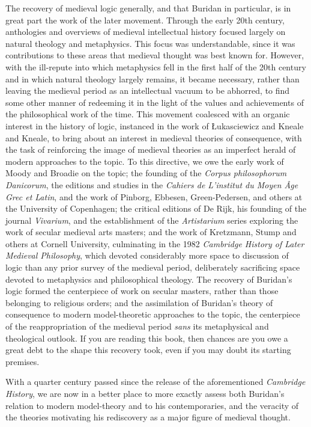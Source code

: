 The recovery of medieval logic generally, and that Buridan in particular, is in great part the work of the later movement. Through the early 20th century, anthologies and overviews of medieval intellectual history focused largely on natural theology and metaphysics. This focus was understandable, since it was contributions to these areas that medieval thought was best known for. However, with the ill-repute into which metaphysics fell in the first half of the 20th century and in which natural theology largely remains, it became necessary, rather than leaving the medieval period as an intellectual vacuum to be abhorred, to find some other manner of redeeming it in the light of the values and achievements of the philosophical work of the time. This movement coalesced with an organic interest in the history of logic, instanced in the work of \L{}ukasciewicz and Kneale and Kneale, to bring about an interest in medieval theories of consequence, with the task of reinforcing the image of medieval theories as an imperfect herald of modern approaches to the topic. To this directive, we owe the early work of Moody and Broadie on the topic; the founding of the \textit{Corpus philosophorum Danicorum}, the editions and studies in the \textit{Cahiers de L'institut du Moyen \^{A}ge Grec et Latin}, and the work of Pinborg, Ebbesen, Green-Pedersen, and others at the University of Copenhagen; the critical editions of De Rijk, his founding of the journal \textit{Vivarium}, and the establishment of the \textit{Artistarium} series exploring the work of secular medieval arts masters; and the work of Kretzmann, Stump and others at Cornell University, culminating in the 1982 \textit{Cambridge History of Later Medieval Philosophy}, which devoted considerably more space to discussion of logic than any prior survey of the medieval period, deliberately sacrificing space devoted to metaphysics and philosophical theology. The recovery of Buridan's logic formed the centerpiece of work on secular masters, rather than those belonging to religious orders; and the assimilation of Buridan's theory of consequence to modern model-theoretic approaches to the topic, the centerpiece of the reappropriation of the medieval period \textit{sans} its metaphysical and theological outlook. If you are reading this book, then chances are you owe a great debt to the shape this recovery took, even if you may doubt its starting premises.

With a quarter century passed since the release of the aforementioned \textit{Cambridge History}, we are now in a better place to more exactly assess both Buridan's relation to modern model-theory and to his contemporaries, and the veracity of the theories motivating his rediscovery as a major figure of medieval thought.

